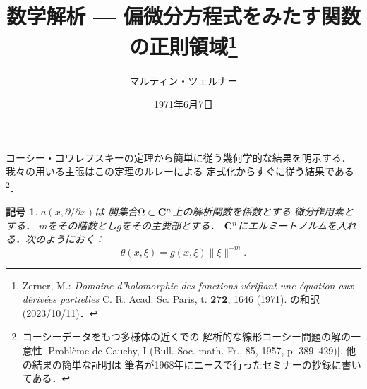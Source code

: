 \theoremstyle{mystyle}
\newtheorem{AXM}{公理}
\newtheorem{DFN}{定義}
\newtheorem{THM}{定理}
\newtheorem*{THM*}{定理}
\newtheorem{PRP}{命題}
\newtheorem{LMM}[Axiom]{補題}
\newtheorem{CRL}{系}
\newtheorem*{CRL*}{系}
\newtheorem{EG}[Axiom]{例}
\newtheorem{CNV}[Axiom]{規約}
\newtheorem{NTN}[Axiom]{記号}
\newtheorem*{NTN*}{記号}
\newtheorem{CMT}{コメント}
\newtheorem{RMK}{注意}
\newtheorem*{RMK*}{注意}






\def\inner<#1>{\langle #1 \rangle}








\title{数学解析 --- 偏微分方程式をみたす関数の正則領域\footnote{
    Zerner, M.: \textit{Domaine d'holomorphie des fonctions v\'erifiant une \'equation aux d\'eriv\'ees partielles}
    C. R. Acad. Sc. Paris, t. \textbf{272}, 1646 (1971). の和訳 (2023/10/11)．
}}
\author{マルティン・ツェルナー}
\date{1971年6月7日}

\maketitle

コーシー・コワレフスキーの定理から簡単に従う幾何学的な結果を明示する．
我々の用いる主張はこの定理のルレーによる
定式化からすぐに従う結果である\footnote{
    コーシーデータをもつ多様体の近くでの
    解析的な線形コーシー問題の解の一意性 
    [Probl\`eme de Cauchy, I 
    (Bull. Soc. math. Fr., 85, 1957, p. 389--429)]. 
    他の結果の簡単な証明は
    筆者が1968年にニースで行ったセミナーの抄録に書いてある．
}．

\begin{NTN*}
    \(a(x,\partial/\partial x)\)は
    開集合\(\Omega\subset\mathbf{C}^n\)上の解析関数を係数とする
    微分作用素とする．
    \(m\)をその階数とし\(g\)をその主要部とする．
    \(\mathbf{C}^n\)にエルミートノルムを入れる．次のようにおく：
    \[
        \theta(x,\xi)=g(x,\xi)\lVert\xi\rVert^{-m}.
    \]
\end{NTN*}

